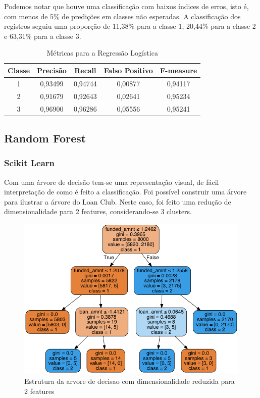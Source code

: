 Podemos notar que houve uma classificação com baixos índices de erros, isto é, com menos de 5\% de predições em classes não esperadas. A classificação dos registros seguiu uma proporção de 11,38\% para a classe 1, 20,44\% para a classe 2 e 63,31\% para a classe 3.

\begin{table}[!ht]
  \caption{Métricas para a Regressão Logística}
  \centering
  \begin{tabular}{ c c c c c } \toprule
  Classe & Precisão & Recall  & Falso Positivo & F-measure  \\\midrule
    1    & 0,93499  & 0,94744 & 0,00877        & 0,94117    \\
    2    & 0,91679  & 0,92643 & 0,02641        & 0,95234    \\
    3    & 0,96900  & 0,96286 & 0,05556        & 0,95241 \\\bottomrule
\end{tabular}
\end{table}

\subsection{Random Forest}


\subsubsection{Scikit Learn}

Com uma árvore de decisão tem-se uma representação visual, de fácil interpretação de como é feito a classificação. Foi possível construir uma árvore para ilustrar a árvore do Loan Club. Neste caso, foi feito uma redução de dimensionalidade para 2 features, considerando-se 3 clusters.



\begin{figure}[!ht]
\caption{Estrutura da arvore de decisao com dimensionalidade reduzida para 2 features}
\centerline{\includegraphics[width=.7\textwidth]{img/loan}}
\end{figure}

